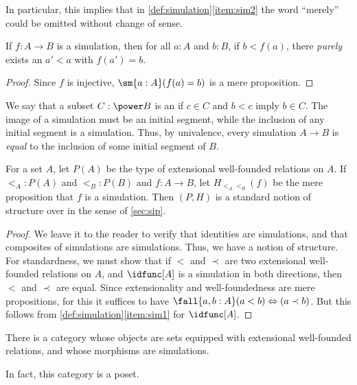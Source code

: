 In particular, this implies that in \cref{def:simulation}\ref{item:sim2} the word ``merely'' could be omitted without change of sense.

\begin{cor}
  If $f:A\to B$ is a simulation, then for all $a:A$ and $b:B$, if $b<f(a)$, there \emph{purely} exists an $a'<a$ with $f(a')=b$.
\end{cor}
\begin{proof}
  Since $f$ is injective, $\sm{a:A} (f(a)=b)$ is a mere proposition.
\end{proof}

We say that a subset $C :\power B$ is an 
%
%
if $c\in C$ and $b<c$ imply $b\in C$.
The image of a simulation must be an initial segment, while the inclusion of any initial segment is a simulation.
Thus, by univalence, every simulation $A\to B$ is \emph{equal} to the inclusion of some initial segment of $B$.

\begin{thm}
  For a set $A$, let $P(A)$ be the type of extensional well-founded relations on $A$.
  If $\mathord{<_A} : P(A)$ and $\mathord{<_B} : P(B)$ and $f:A\to B$, let $H_{\mathord{<_A}\mathord{<_B}}(f)$ be the mere proposition that $f$ is a simulation.
  Then $(P,H)$ is a standard notion of structure over \uset in the sense of \cref{sec:sip}.
\end{thm}
\begin{proof}
  We leave it to the reader to verify that identities are simulations, and that composites of simulations are simulations.
  Thus, we have a notion of structure.
  For standardness, we must show that if $<$ and $\prec$ are two extensional well-founded relations on $A$, and $\idfunc[A]$ is a simulation in both directions, then $<$ and $\prec$ are equal.
  Since extensionality and well-foundedness are mere propositions, for this it suffices to have $\fall{a,b:A} (a<b) \Leftrightarrow (a\prec b)$.
  But this follows from \cref{def:simulation}\ref{item:sim1} for $\idfunc[A]$.
\end{proof}

\begin{cor}\label{thm:wfcat}
  There is a category whose objects are sets equipped with extensional well-founded relations, and whose morphisms are simulations.
\end{cor}

In fact, this category is a poset.

